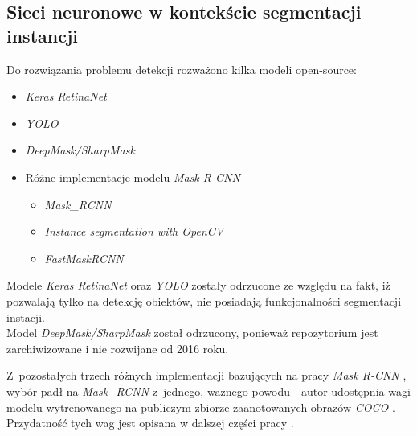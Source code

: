 \subsection{Sieci neuronowe w kontekście segmentacji instancji}

Do rozwiązania problemu detekcji rozważono kilka modeli open-source:

\begin{itemize}
	\item \textit{Keras RetinaNet} \cite{keras-retinanet} \cite{keras-retinanet-implementation}
	\item \textit{YOLO} \cite{yolo} \cite{yolo-implementation}
	\item \textit{DeepMask/SharpMask} \cite{deepmask} \cite{sharpmask} \cite{deep-sharp-mask}
	\item Różne implementacje modelu \textit{Mask R-CNN} \cite{general-mask-rcnn}
		\begin{itemize}
			\item \textit{Mask\_RCNN} \cite{matterport-mask-rcnn}
			\item \textit{Instance segmentation with OpenCV} \cite{mask-rcnn-opencv}
			\item \textit{FastMaskRCNN} \cite{fast-mask-rcnn}
		\end{itemize}
\end{itemize}

Modele \textit{Keras RetinaNet} oraz \textit{YOLO} zostały odrzucone ze względu na fakt, iż pozwalają tylko na detekcję obiektów, nie posiadają funkcjonalności segmentacji instacji. \\

Model \textit{DeepMask/SharpMask} został odrzucony, ponieważ repozytorium jest zarchiwizowane i nie rozwijane od 2016 roku.

Z~pozostałych trzech różnych implementacji bazujących na pracy \textit{Mask R-CNN} \cite{general-mask-rcnn}, wybór padł na \textit{Mask\_RCNN} \cite{matterport-mask-rcnn} z~jednego, ważnego powodu - autor udostępnia wagi modelu wytrenowanego na publiczym zbiorze zaanotowanych obrazów \textit{COCO} \cite{coco}.
Przydatność tych wag jest opisana w dalszej części pracy .
